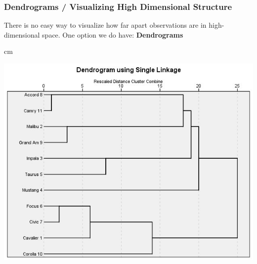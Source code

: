 \documentclass{beamer} %
\begin{document}
\begin{frame}\frametitle{Dendrograms / Visualizing High Dimensional Structure}
	\small
	\centering
	
	There is no easy way to visualize how far apart observations are in high-dimensional space.  One option we do have:  \textbf{Dendrograms}
	
	 cm
	
	\includegraphics[width = 0.81\linewidth]{dendro.jpg}
	
\end{frame}
\end{document}
